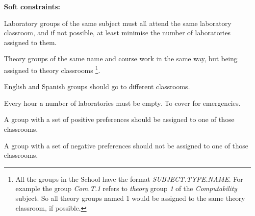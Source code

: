 \textbf{Soft constraints:}

\begin{description}
    \item Laboratory groups of the same subject must all attend the same laboratory classroom, and if not possible, at least minimise the number of laboratories assigned to them.
    \item Theory groups of the same name and course work in the same way, but being assigned to theory classrooms \footnote{All the groups in the School have the format \textit{SUBJECT.TYPE.NAME}. For example the group \textit{Com.T.1} refers to \textit{theory} group \textit{1} of the \textit{Computability} subject. So all theory groups named 1 would be assigned to the same theory classroom, if possible.}.
    \item English and Spanish groups should go to different classrooms.
    \item Every hour a number of laboratories must be empty. To cover for emergencies.
    \item A group with a set of positive preferences should be assigned to one of those classrooms.
    \item A group with a set of negative preferences should not be assigned to one of those classrooms.
\end{description}

